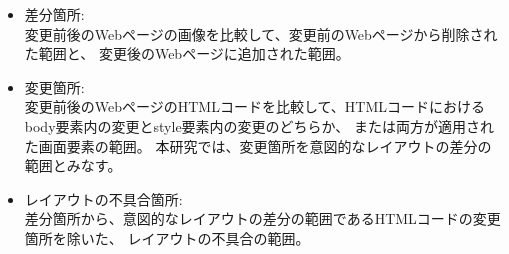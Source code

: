 \begin{itemize}
      \item 差分箇所:\\
            変更前後のWebページの画像を比較して、変更前のWebページから削除された範囲と、
            変更後のWebページに追加された範囲。
      \item 変更箇所:\\
            変更前後のWebページのHTMLコードを比較して、HTMLコードにおけるbody要素内の変更とstyle要素内の変更のどちらか、
            または両方が適用された画面要素の範囲。
            本研究では、変更箇所を意図的なレイアウトの差分の範囲とみなす。
      \item レイアウトの不具合箇所:\\
            差分箇所から、意図的なレイアウトの差分の範囲であるHTMLコードの変更箇所を除いた、
            レイアウトの不具合の範囲。
\end{itemize}


